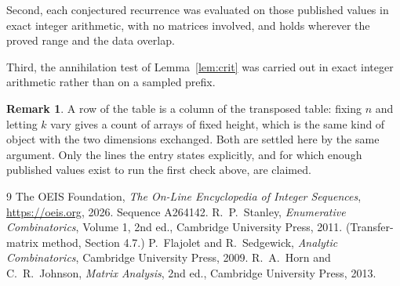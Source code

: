 \documentclass[11pt,a4paper]{article}
\theoremstyle{plain}
\theoremstyle{definition}
\newtheorem{remark}[theorem]{Remark}
\begin{document}
Second, each conjectured recurrence was evaluated on those published values in exact
integer arithmetic, with no matrices involved, and holds wherever the proved range and the
data overlap.

Third, the annihilation test of Lemma~\ref{lem:crit} was carried out in exact integer
arithmetic rather than on a sampled prefix.

\begin{remark}
A row of the table is a column of the transposed table: fixing $n$ and letting $k$ vary gives a
count of arrays of fixed height, which is the same kind of object with the two dimensions
exchanged. Both are settled here by the same argument. Only the lines the entry states
explicitly, and for which enough published values exist to run the first check above, are
claimed.
\end{remark}

\begin{thebibliography}{9}
 The OEIS Foundation, \emph{The On-Line Encyclopedia of Integer
Sequences}, \url{https://oeis.org}, 2026. Sequence A264142.
 R.~P.~Stanley, \emph{Enumerative Combinatorics}, Volume 1, 2nd ed.,
Cambridge University Press, 2011. (Transfer-matrix method, Section 4.7.)
 P.~Flajolet and R.~Sedgewick, \emph{Analytic Combinatorics}, Cambridge
University Press, 2009.
 R.~A.~Horn and C.~R.~Johnson, \emph{Matrix Analysis}, 2nd ed., Cambridge
University Press, 2013.
\end{thebibliography}
\end{document}
